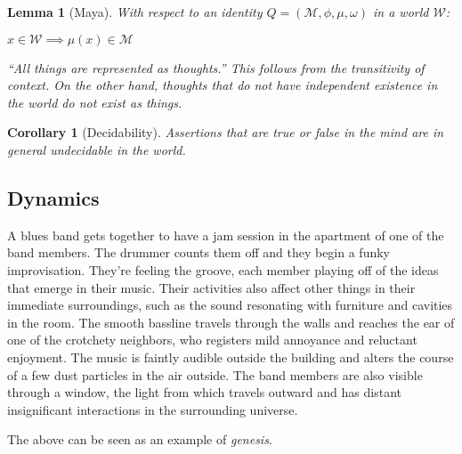 \documentclass[pra,twocolumn,groupedaddress,10pt]{revtex4}
\newtheorem{lemma}[theorem]{Lemma}
\newtheorem{corollary}[theorem]{Corollary}
\theoremstyle{definition}
\begin{document}
\begin{lemma}[Maya] \label{lem:maya}
	With respect to an identity $Q = (\mathcal{M}, \phi, \mu, \omega)$ in a world $\mathcal{W}$:
	\begin{center}
		$x \in \mathcal{W} \implies \mu(x) \in \mathcal{M}$
	\end{center}
	 ``All things are represented as thoughts.'' This follows from the transitivity of context. On the other hand, thoughts that do not have independent existence in the world do not exist as things.
\end{lemma}

\begin{corollary}[Decidability] \label{cor:decidability}
	Assertions that are true or false in the mind are in general undecidable in the world.
\end{corollary}

\subsection{Dynamics} \label{sec:dynamics}

A blues band gets together to have a jam session in the apartment of one of the band members. The drummer counts them off and they begin a funky improvisation. They're feeling the groove, each member playing off of the ideas that emerge in their music. Their activities also affect other things in their immediate surroundings, such as the sound resonating with furniture and cavities in the room. The smooth bassline travels through the walls and reaches the ear of one of the crotchety neighbors, who registers mild annoyance and reluctant enjoyment. The music is faintly audible outside the building and alters the course of a few dust particles in the air outside. The band members are also visible through a window, the light from which travels outward and has distant insignificant interactions in the surrounding universe.

The above can be seen as an example of \emph{genesis}.
\end{document}
